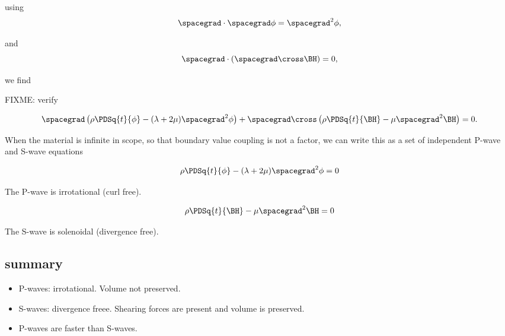 using 
\begin{equation}\label{eqn:continuumL7:410}
\spacegrad \cdot \spacegrad \phi = \spacegrad^2 \phi,
\end{equation}

and 
\begin{equation}\label{eqn:continuumL7:430}
\spacegrad \cdot (\spacegrad \cross \BH) = 0 ,
\end{equation}

we find 

FIXME: verify

\begin{equation}\label{eqn:continuumL7:450}
\spacegrad 
\left(
\rho \PDSq{t}{\phi} - (\lambda + 2\mu) \spacegrad^2 \phi
\right)
+ 
\spacegrad \cross 
\left(
\rho \PDSq{t}{\BH} - \mu \spacegrad^2 \BH
\right)
= 0.
\end{equation}

When the material is infinite in scope, so that boundary value coupling is not a factor, we can write this as a set of independent P-wave and S-wave equations

\begin{equation}\label{eqn:continuumL7:470}
\rho \PDSq{t}{\phi} - (\lambda + 2\mu) \spacegrad^2 \phi = 0
\end{equation}

The P-wave is irrotational (curl free).

\begin{equation}\label{eqn:continuumL7:490}
\rho \PDSq{t}{\BH} - \mu \spacegrad^2 \BH = 0
\end{equation}

The S-wave is solenoidal (divergence free).

\subsection{summary}

\begin{itemize}
\item 
P-waves: irrotational.  Volume not preserved.
\item 
S-waves: divergence freee.  Shearing forces are present and volume is preserved.
\item 
P-waves are faster than S-waves.
\end{itemize}

\EndArticle
